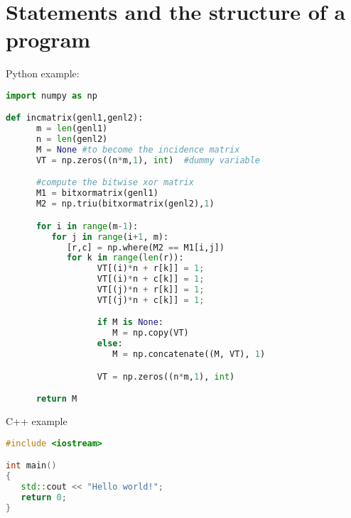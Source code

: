 \documentclass[../main.tex]{subfiles}
\begin{document}
\section*{Statements and the structure of a program}

Python example:

\begin{lstlisting}[language=Python, caption=Python example]
import numpy as np

def incmatrix(genl1,genl2):
      m = len(genl1)
      n = len(genl2)
      M = None #to become the incidence matrix
      VT = np.zeros((n*m,1), int)  #dummy variable

      #compute the bitwise xor matrix
      M1 = bitxormatrix(genl1)
      M2 = np.triu(bitxormatrix(genl2),1)

      for i in range(m-1):
         for j in range(i+1, m):
            [r,c] = np.where(M2 == M1[i,j])
            for k in range(len(r)):
                  VT[(i)*n + r[k]] = 1;
                  VT[(i)*n + c[k]] = 1;
                  VT[(j)*n + r[k]] = 1;
                  VT[(j)*n + c[k]] = 1;

                  if M is None:
                     M = np.copy(VT)
                  else:
                     M = np.concatenate((M, VT), 1)

                  VT = np.zeros((n*m,1), int)

      return M
\end{lstlisting}

\noindent C++ example

\begin{lstlisting}[language=C++, caption=C++ example]
#include <iostream>

int main()
{
   std::cout << "Hello world!";
   return 0;
}
\end{lstlisting}
\end{document}
